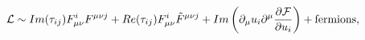 \begin{equation}
{\cal L}\sim Im(\tau_{ij})F_{\mu\nu}^iF^{\mu\nu j}+Re(\tau_{ij})F_{\mu\nu}^i\tilde F^{\mu\nu j}+ Im \left ( \partial_\mu u_i \partial^\mu\frac{\partial {\cal F}}{\partial u_i}\right )+{\rm fermions},
\end{equation}


